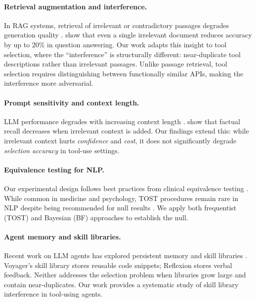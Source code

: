 \documentclass[11pt]{article}
\begin{document}
\paragraph{Retrieval augmentation and interference.}
In RAG systems, retrieval of irrelevant or contradictory passages degrades generation quality \citep{shi2023large}. \citet{xu2024context} show that even a single irrelevant document reduces accuracy by up to 20\% in question answering. Our work adapts this insight to tool selection, where the ``interference'' is structurally different: near-duplicate tool descriptions rather than irrelevant passages. Unlike passage retrieval, tool selection requires distinguishing between functionally similar APIs, making the interference more adversarial.

\paragraph{Prompt sensitivity and context length.}
LLM performance degrades with increasing context length \citep{liu2024lost}. \citet{razeghi2022impact} show that factual recall decreases when irrelevant context is added. Our findings extend this: while irrelevant context hurts \emph{confidence} and \emph{cost}, it does not significantly degrade \emph{selection accuracy} in tool-use settings.

\paragraph{Equivalence testing for NLP.}
Our experimental design follows best practices from clinical equivalence testing \citep{schuirmann1987comparison,lakens2017equivalence}. While common in medicine and psychology, TOST procedures remain rare in NLP despite being recommended for null results \citep{dienes2016bayesian}. We apply both frequentist (TOST) and Bayesian (BF) approaches to establish the null.

\paragraph{Agent memory and skill libraries.}
Recent work on LLM agents has explored persistent memory \citep{wang2024voyager, shinn2023reflexion} and skill libraries \citep{wang2024voyager}. Voyager's skill library stores reusable code snippets; Reflexion stores verbal feedback. Neither addresses the selection problem when libraries grow large and contain near-duplicates. Our work provides a systematic study of skill library interference in tool-using agents.
\end{document}
